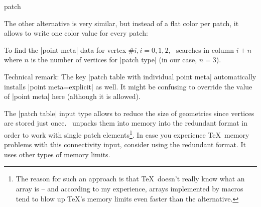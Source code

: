 {\begin{plottype}[/pgfplots]{patch}
\begin{pgfplotskeylist}
	The other alternative  is very similar, but instead of a flat color per patch, it allows to write one color value for every patch:
\begin{codeexample}[]
\end{codeexample}
	\noindent To find the |point meta| data for vertex $\#i, i=0,1,2$, \PGFPlots\ searches in column $i+n$ where $n$ is the number of vertices for |patch type| (in our case, $n=3$). 
	
	Technical remark: The key |patch table with individual point meta| automatically installs |point meta=explicit| as well. It might be confusing to override the value of |point meta| here (although it is allowed). 

	The |patch table| input type allows to reduce the size of geometries since vertices are stored just once. \PGFPlots\ unpacks them into memory into the redundant format in order to work with single patch elements\footnote{The reason for such an approach is that \TeX\ doesn't really know what an array is -- and according to my experience, arrays implemented by macros tend to blow up \TeX's memory limits even faster than the alternative.}. In case you experience \TeX\ memory problems with this connectivity input, consider using the redundant format. It uses other types of memory limits.
\end{pgfplotskeylist}
	

\end{plottype}}
